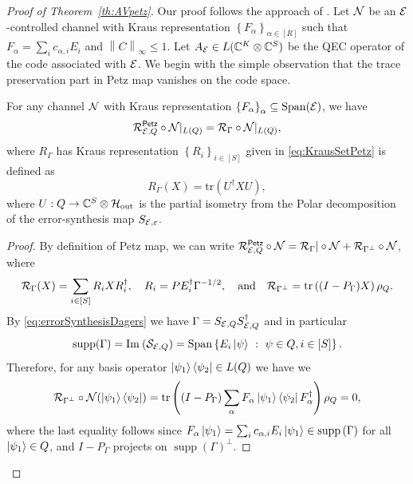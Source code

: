\documentclass[10pt]{article}
\DeclareMathOperator{\supp}{supp}
\DeclareMathOperator{\Span}{Span}
\newcommand{\SOUT}{\mathrm{out}}
\newcommand{\ima}{\mathrm{Im}\:}
\newcommand{\tr}{\mathrm{tr}}
\newcommand{\C}{\mathbb{C}}
\newcommand{\p}[1]{\left(#1\right)}
\newcommand{\ppp}[1]{\left\{#1\right\}}
\newcommand{\norm}[1]{\left\|#1\right\|}
\newcommand{\s}[1]{\mathsf{#1}}
\begin{document}
 \begin{proof}[Proof of Theorem~\ref{th:AVpetz}] 
     Our proof follows the approach of \cite{zheng2024near}. Let ${\cal N}$ be an ${\cal E}$-controlled channel with Kraus representation $\ppp{F_{\alpha}}_{\alpha\in [R]}$ such that $F_{\alpha}=\sum_{i}c_{\alpha,i}E_i$ and $\norm{C}_{\infty}\leq 1$. Let $A_{\calE}\in L(\C^K\otimes \C^S)$ be the QEC operator of the code associated with ${\cal E}$. We begin with the simple observation that the trace preservation part in Petz map vanishes on the code space.
     \begin{lemma}\label{lem:supportCodePetz}
         For any channel ${\cal N}$ with Kraus representation $\ppp{F_\alpha}_\alpha\subseteq\Span(\calE)$, we have 
         \[\calR_{\calE,Q}^{\s{Petz}}\circ \calN|_{L(Q)}=\calR_{\Gamma}\circ \calN|_{L(Q)}, \]
         where $R_\Gamma$ has Kraus representation $\ppp{R_{i}}_{i\in[S]}$ given in \eqref{eq:KrausSetPetz} is defined as
         \[R_{\Gamma}(X)=\tr(U^\dag X U),\]
         where $U:Q\to \C^S\otimes  \calH_{\SOUT}$ 
                is the partial isometry from the Polar decomposition of the error-synthesis map $S_{{\cal E},\varepsilon}$.
     \end{lemma}
    \begin{proof}
         By definition of Petz map, we can write $\calR_{\calE,Q}^{\s{Petz}}\circ \calN=\calR_{\Gamma}|\circ \calN+\calR_{\Gamma^\perp}\circ \calN$, where 
     \[\calR_{\Gamma}(X)=\sum_{i\in[S]}R_iXR_i^\dag,\quad R_i=PE_i^\dag \Gamma^{-1/2}, \quad \text{and}\quad \calR_{\Gamma^{\perp}}=\tr\p{(I-P_{\Gamma})X}\rho_Q.\]
     By \eqref{eq:errorSynthesisDagers} we have $\Gamma=S_{{\cal E},Q}S_{{\cal E},Q}^\dag$ and in particular \[\supp(\Gamma)=\ima(\calS_{\calE,Q})=\Span\ppp{E_i\ket{\psi}~:~ \psi\in Q, i\in [S]}.\]
     Therefore, for any basis operator $\ket{\psi_1}\bra{\psi_2}\in L(Q)$ we have we 
     \[\calR_{\Gamma^\perp}\circ \calN(\ket{\psi_1}\bra{\psi_2})=\tr\p{(I-P_\Gamma)\sum_{\alpha}F_\alpha \ket{\psi_1}\bra{\psi_2} F_{\alpha}^\dag }\rho_{Q}=0,\]
     where the last equality follows since $F_{\alpha}\ket{\psi_1}=\sum_{i}c_{\alpha,i}E_i\ket{\psi_1}\in \supp\p{\Gamma}$ for all $\ket{\psi_1}\in Q$, and $I-P_{\Gamma}$ projects on $\supp(\Gamma)^{\perp}$. 
    \end{proof} 
    

\end{proof}
\end{document}
